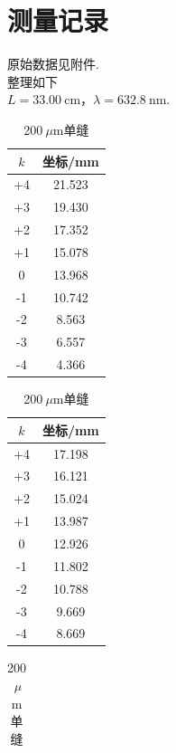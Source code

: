 \documentclass[a4paper]{article}%
\newcommand{\suo}{\indent}%
\begin{document}
\section{测量记录}
原始数据见附件.\\整理如下
\\\suo $L=33.00~$cm，$\lambda=632.8~$nm.
\begin{table}[H]
    \begin{minipage}{0.18\linewidth}
        \centering
        \begin{tabular}{cc}
            \toprule
            $k$ & 坐标/mm\\
            \midrule
            +4&21.523\\
            +3&19.430\\
            +2&17.352\\
            +1&15.078\\
            0&13.968\\
            -1&10.742\\
            -2&8.563\\
            -3&6.557\\
            -4&4.366\\
            \bottomrule
        \end{tabular}
        \caption{100$~\mu$m单缝}\label{1}
    \end{minipage}
    \begin{minipage}{0.18\linewidth}  
        \centering
        \begin{tabular}{cc} 
            \toprule
            $k$ & 坐标/mm\\
            \midrule
            +4&17.198\\
            +3&16.121\\
            +2&15.024\\
            +1&13.987\\
            0&12.926\\
            -1&11.802\\
            -2&10.788\\
            -3&9.669\\
            -4&8.669\\
            \bottomrule
        \end{tabular}
        \caption{200$~\mu$m单缝}
    \end{minipage}
    \begin{minipage}{0.18\linewidth}  
        \centering
        \begin{tabular}{cc} 

\end{tabular}
\end{minipage}
\end{table}
\end{document}
